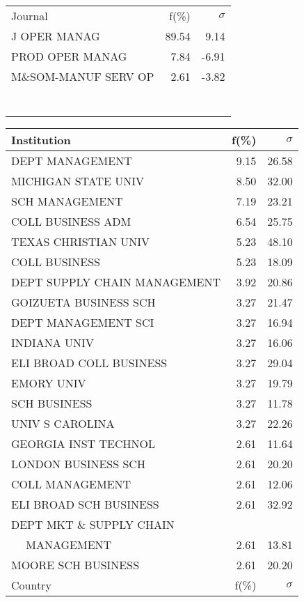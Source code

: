 \documentclass[a4paper,11pt]{report}
\begin{document}
\begin{landscape}
\begin{table}[!ht]
{\begin{tabular}{|l r r|}
 &  & \\
\hline
\hline
Journal & f(\%) & $\sigma$\\
\hline
J OPER MANAG & 89.54 & 9.14\\
PROD OPER MANAG & 7.84 & -6.91\\
M\&SOM-MANUF SERV OP & 2.61 & -3.82\\
 &  & \\
 &  & \\
 &  & \\
 &  & \\
 &  & \\
 &  & \\
 &  & \\
\hline
\end{tabular}
}
{\scriptsize\begin{tabular}{|l r r|}
\hline
Institution & f(\%) & $\sigma$\\
\hline
DEPT MANAGEMENT & 9.15 & 26.58\\
MICHIGAN STATE UNIV & 8.50 & 32.00\\
SCH MANAGEMENT & 7.19 & 23.21\\
COLL BUSINESS ADM & 6.54 & 25.75\\
TEXAS CHRISTIAN UNIV & 5.23 & 48.10\\
COLL BUSINESS & 5.23 & 18.09\\
DEPT SUPPLY CHAIN MANAGEMENT & 3.92 & 20.86\\
GOIZUETA BUSINESS SCH & 3.27 & 21.47\\
DEPT MANAGEMENT SCI & 3.27 & 16.94\\
INDIANA UNIV & 3.27 & 16.06\\
ELI BROAD COLL BUSINESS & 3.27 & 29.04\\
EMORY UNIV & 3.27 & 19.79\\
SCH BUSINESS & 3.27 & 11.78\\
UNIV S CAROLINA & 3.27 & 22.26\\
GEORGIA INST TECHNOL & 2.61 & 11.64\\
LONDON BUSINESS SCH & 2.61 & 20.20\\
COLL MANAGEMENT & 2.61 & 12.06\\
ELI BROAD SCH BUSINESS & 2.61 & 32.92\\
DEPT MKT \& SUPPLY CHAIN &  & \\
$\quad$ MANAGEMENT & 2.61 & 13.81\\
MOORE SCH BUSINESS & 2.61 & 20.20\\
\hline
\hline
Country & f(\%) & $\sigma$\\
\hline

\end{tabular}}
\end{table}
\end{landscape}
\end{document}
